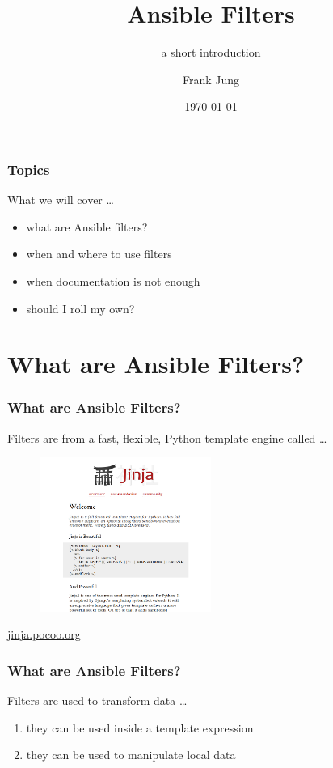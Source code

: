 \documentclass[pdf]{beamer}
\title{Ansible Filters}
\subtitle{a short introduction}
\author{Frank Jung}
\institute{frankhjung@linux.com}
\date{ \today }
\begin{document}
\begin{frame}
  \titlepage{}
\end{frame}


\begin{frame}
  \frametitle{Topics}
  What we will cover \ldots
  \pause{}
  \begin{itemize}
    \item<+-> what are Ansible filters?
    \item<+-> when and where to use filters
    \item<+-> when documentation is not enough
    \item<+-> should I roll my own?
  \end{itemize}
\end{frame}

\section{What are Ansible Filters?}

\begin{frame}
  \frametitle{What are Ansible Filters?}
  Filters are from a fast, flexible, Python template engine called \ldots
  \pause{}
  \begin{center}
    \begin{figure}
      \includegraphics[width=0.5\textwidth]{jinja.png}
    \end{figure}
    \href{http://jinja.pocoo.org}{jinja.pocoo.org}
  \end{center}
\end{frame}

\begin{frame}
  \frametitle{What are Ansible Filters?}
  Filters are used to transform data \ldots
  \pause{}
  \begin{enumerate}
    \item<+->{they can be used inside a template expression}
    \item<+->{they can be used to manipulate local data}
  \end{enumerate}
\end{frame}
\end{document}
